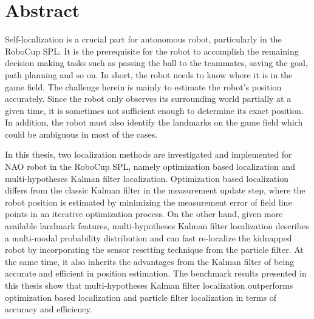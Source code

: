 \thispagestyle{empty}
\chapter*{Abstract}

Self-localization is a crucial part for autonomous robot, particularly in the RoboCup \gls{SPL}. It is the prerequisite for the robot to accomplish the remaining decision making tasks such as passing the ball to the teammates, saving the goal, path planning and so on. In short, the robot needs to know where it is in the game field. The challenge herein is mainly to estimate the robot's position accurately. Since the robot only observes its surrounding world partially at a given time, it is sometimes not sufficient enough to determine its exact position. In addition, the robot must also identify the landmarks on the game field which could be ambiguous in most of the cases. 

In this thesis, two localization methods are investigated and implemented for NAO robot in the RoboCup \gls{SPL}, namely optimization based localization and multi-hypotheses Kalman filter localization.
Optimization based localization differs from the classic Kalman filter in the measurement update step, where the robot position is estimated by minimizing the measurement error of field line points in an iterative optimization process. 
On the other hand, given more available landmark features, multi-hypotheses Kalman filter localization describes a multi-modal probability distribution and can fast re-localize the kidnapped robot by incorporating the sensor resetting technique from the particle filter. At the same time, it also inherits the advantages from the Kalman filter of being accurate and efficient in position estimation. The benchmark results presented in this thesis show that multi-hypotheses Kalman filter localization outperforms optimization based localization and particle filter localization in terms of accuracy and efficiency.
